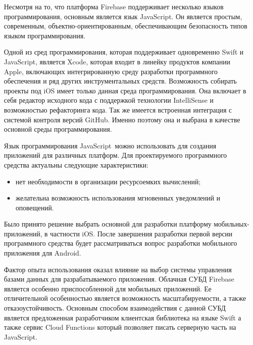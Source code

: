 Несмотря на то, что платформа Firebase поддерживает несколько языков программирования, основным является язык JavaScript. Он является простым, современным, объектно-ориентированным, обеспечивающим безопасность типов языком программирования.

Одной из сред программирования, которая поддерживает одновременно Swift и JavaScript, является Xcode, которая входит в линейку продуктов компании Apple, включающих интегрированную среду разработки программного обеспечения и ряд других инструментальных средств. Возможность собирать проекты под iOS имеет только данная среда программирования. Она включает в себя редактор исходного кода с поддержкой технологии In\-tel\-li\-Sen\-se и возможностью рефакторинга кода. Так же имеется встроенная интеграция с системой контроля версий GitHub. Именно поэтому она и выбрана в качестве основной среды программирования.

Язык программирования JavaScript~можно использовать для создания приложений для различных платформ. Для проектируемого программного сре\-д\-с\-т\-ва актуальны следующие характеристики:
\begin{itemize}
  \item нет необходимости в организации ресурсоемких вычислений;
  \item желательна возможность использования мгновенных уведомлений и оповещений.
\end{itemize}

Было принято решение выбрать основной для разработки платформу мобильных-приложений, в частности iOS. После завершения разработки первой версии программного средства будет рассматриваться вопрос разработки мобильного приложения для Android.

Фактор опыта использования оказал влияние на выбор  системы управления базами данных для разрабатываемого приложения. Облачная СУБД Firebase является особенно приспособленной для мобильных приложений. Ее отличительной особенностью является возможность масштабируемости, а также отказоустойчивость. Основным способом взаимодействия с данной СУБД является предложенная разработчиком клиентская библиотека на языке Swift а также сервис Cloud Functions который позволяет писать серверную часть на JavaScript.